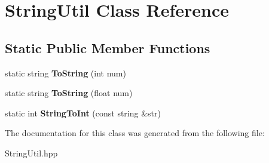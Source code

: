 \hypertarget{classStringUtil}{}\section{String\+Util Class Reference}
\label{classStringUtil}
\subsection*{Static Public Member Functions}
\begin{DoxyCompactItemize}
\item 
static string {\bfseries To\+String} (int num)\hypertarget{classStringUtil_ad55af94041a3d1608863c2021cc12963}{}\label{classStringUtil_ad55af94041a3d1608863c2021cc12963}

\item 
static string {\bfseries To\+String} (float num)\hypertarget{classStringUtil_a95873855bfa474e34bc9adb4306f1326}{}\label{classStringUtil_a95873855bfa474e34bc9adb4306f1326}

\item 
static int {\bfseries String\+To\+Int} (const string \&str)\hypertarget{classStringUtil_a7f166cec1001bb127209c893f8485430}{}\label{classStringUtil_a7f166cec1001bb127209c893f8485430}

\end{DoxyCompactItemize}


The documentation for this class was generated from the following file\+:\begin{DoxyCompactItemize}
\item 
String\+Util.\+hpp\end{DoxyCompactItemize}
